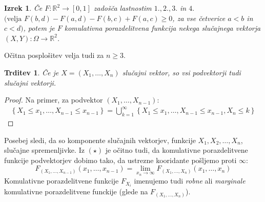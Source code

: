 \documentclass[12pt]{book}
\def\n{\noindent}
\theoremstyle{definition}
\theoremstyle{plain}
\newtheorem{izrek}{Izrek}
\theoremstyle{plain}
\newtheorem{trditev}{Trditev}
\theoremstyle{plain}
\theoremstyle{plain}
\theoremstyle{remark}
\begin{document}
\begin{izrek}
    Če $F: \mathbb{R}^2 \rightarrow[0,1]$ zadošča lastnostim $1., 2., 3.$ in $4.$ $(\text{velja } F(b, d)-F(a, d)-F(b, c)+F(a, c) \geq 0$, za vse četverice $a<b$ in $c<d)$, potem je $F$ komulativna porazdelitvena funkcija nekega slučajnega vektorja $(X,Y): \Omega \to \mathbb{R}^2$. 
\end{izrek}

\n Očitna posplošitev velja tudi za $n \geq 3$. 

\begin{trditev}
    Če je $X=\left(X_1, \ldots, X_n\right)$ slučajni vektor, so vsi podvektorji tudi slučajni vektorji.
\end{trditev}

\begin{proof}
    Na primer, za podvektor $\left(X_1, \ldots, X_{n-1}\right)$: 
    \begin{align}
        \left\{X_1 \leq x_1, \ldots, X_{n-1} \leq x_{n-1}\right\}=\bigcup_{k=1}^{\infty}\left\{X_1 \leq x_1, \ldots, X_{n-1} \leq x_{n-1}, X_n \leq k\right\} \tag{$\star$} 
    \end{align}
\end{proof}

\n Posebej sledi, da so komponente slučajnih vektorjev, funkcije $X_1, X_2, \ldots, X_n$, slučajne spremenljivke. Iz $(\star)$ je očitno tudi, da komulativne porazdelitvene funkcije podvektorjev dobimo tako, da ustrezne kooridante pošljemo proti $\infty$:
$$
F_{\left(X_1, \ldots, X_{n-1}\right)}\left(x_1, \ldots, x_{n-1}\right)=\lim _{x_n \to \infty} F_{\left(X_1, \ldots, X_n\right)}\left(x_1, \ldots, x_n\right)
$$
Komulativne porazdelitvene funkcije $F_{X_i}$ imenujemo tudi \emph{robne} ali \emph{marginale} komulativne porazdelitvene funckije (glede na $F_{(X_1, \ldots, X_n)}$). 
\end{document}
